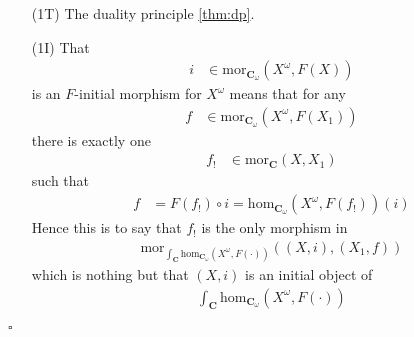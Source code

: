 \begin{prf}
\begin{enumerate}
\item[(1T)]
The duality principle \ref{thm:dp}.
\iffalse
That
\begin{align*}
  t
  &\in
  \mathrm{mor}_{\mathbf{C}_{\omega}}(F(X),X^{\omega})
\end{align*}
is an $F$-terminal morphism for $X^{\omega}$ means that for any
\begin{align*}
  f
  &\in
  \mathrm{mor}_{\mathbf{C}_{\omega}}(F(X_{1}),X^{\omega})
\end{align*}
there is exactly one
\begin{align*}
  f_{!}
  &\in
  \mathrm{mor}_{\mathbf{C}}(X_{1},X)
  =
  \mathrm{mor}_{\mathbf{C}^{\mathrm{op}}}(X,X_{1})
\end{align*}
such that
\begin{align*}
  f
  &=
  t
  \circ
  F(f_{!})
  =
  \mathrm{hom}_{\mathbf{C}_{\omega}}(F(f_{!}),X^{\omega})(t)
\end{align*}
Hence this is to say that $f_{!}$ is the only morphism in
\begin{align*}
  \mathrm{mor}_{\int_{\mathbf{C}}^{\prime}\mathrm{hom}_{\mathbf{C}_{\omega}}(F^{\mathrm{op}}(\cdot),X^{\omega})}((X_{1},f),(X,t))
\end{align*}
which is nothing but that $(X,t)$ is a terminal object of
\begin{align*}
  \int_{\mathbf{C}}^{\prime}
  \mathrm{hom}_{\mathbf{C}_{\omega}}(F^{\mathrm{op}}(\cdot),X^{\omega})
\end{align*}
\fi
\item[(1I)]
That
\begin{align*}
  i
  &\in
  \mathrm{mor}_{\mathbf{C}_{\omega}}(X^{\omega},F(X))
\end{align*}
is an $F$-initial morphism for $X^{\omega}$ means that for any
\begin{align*}
  f
  &\in
  \mathrm{mor}_{\mathbf{C}_{\omega}}(X^{\omega},F(X_{1}))
\end{align*}
there is exactly one
\begin{align*}
  f_{!}
  &\in
  \mathrm{mor}_{\mathbf{C}}(X,X_{1})
\end{align*}
such that
\begin{align*}
  f
  &=
  F(f_{!})
  \circ
  i
  =
  \mathrm{hom}_{\mathbf{C}_{\omega}}(X^{\omega},F(f_{!}))(i)
\end{align*}
Hence this is to say that $f_{!}$ is the only morphism in
\begin{align*}
  \mathrm{mor}_{\int_{\mathbf{C}}\mathrm{hom}_{\mathbf{C}_{\omega}}(X^{\omega},F(\cdot))}((X,i),(X_{1},f))
\end{align*}
which is nothing but that $(X,i)$ is an initial object of
\begin{align*}
  \int_{\mathbf{C}}
  \mathrm{hom}_{\mathbf{C}_{\omega}}(X^{\omega},F(\cdot))
\end{align*}
\end{enumerate}
\phantom{proven}
\hfill
$\square$
\end{prf}
